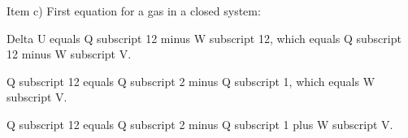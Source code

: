 Item c) First equation for a gas in a closed system:

Delta U equals Q subscript 12 minus W subscript 12, which equals Q subscript 12 minus W subscript V.

Q subscript 12 equals Q subscript 2 minus Q subscript 1, which equals W subscript V.

Q subscript 12 equals Q subscript 2 minus Q subscript 1 plus W subscript V.